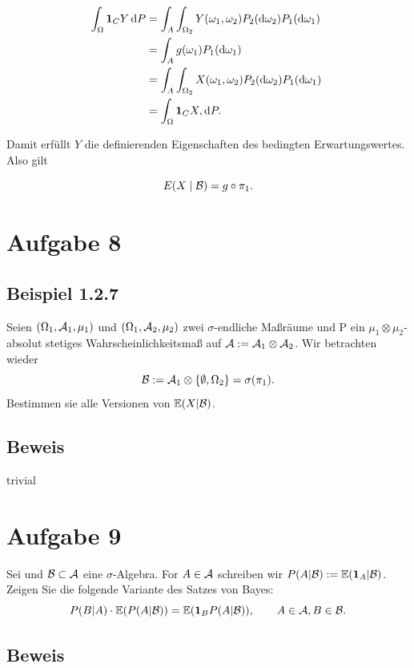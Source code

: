\documentclass[12pt]{scrartcl}
\begin{document}
$$ \begin{aligned}
\int_\Om \mathbf 1_CY\diff P &=\int_A\int_{\Om_2}Y(\om_1,\om_2)P_2(\diff \om_2)P_1(\diff \om_1)\ \\
&=\int_A g(\om_1)P_1(\diff \om_1)\ \\
&=\int_A\int_{\Om_2}X(\om_1,\om_2)P_2(\diff \om_2)P_1(\diff \om_1)\ \\
&=\int_\Om \mathbf 1_CX,\diff P. 
\end{aligned} $$

Damit erfüllt $Y$ die definierenden Eigenschaften des bedingten Erwartungswertes. Also gilt

$$E(X\mid \mathcal{B})=g\circ\pi_1.$$


\ausruecken

\section*{Aufgabe 8}
\subsection*{Beispiel 1.2.7}
\einruecken

Seien $(\Omega_1, \mathcal{A}_1, \mu_1)$ und $(\Omega_1, \mathcal{A}_2, \mu_2)$ zwei $\sigma$-endliche Maßräume und P ein $\mu_1\otimes\mu_2$-absolut stetiges Wahrscheinlichkeitsmaß auf $\mathcal{A} := \mathcal{A}_1\otimes\mathcal{A}_2$. Wir betrachten wieder
$$\mathcal{B} := \mathcal{A}_1\otimes\{\emptyset,\Omega_2\}=\sigma(\pi_1).$$
Bestimmen sie alle Versionen von $\mathbb{E}(X|\mathcal{B})$. %

\ausruecken

\subsection*{Beweis}
\einruecken

trivial

\ausruecken

\section*{Aufgabe 9}
\einruecken

Sei \WraumAnn{} und $\mathcal{B} \subset \mathcal{A}$ eine $\sigma$-Algebra. For $A\in \mathcal{A}$ schreiben wir $P(A|\mathcal{B}) := \mathbb{E}(\textbf{1}_A|\mathcal{B})$. Zeigen Sie die folgende Variante des Satzes von Bayes:
$$P(B|A)\cdot\mathbb{E}(P(A|\mathcal{B}))=\mathbb{E}(\textbf{1}_B P(A|\mathcal{B})),\qquad A\in\mathcal{A},B\in\mathcal{B}.$$

\ausruecken

\subsection*{Beweis}
\einruecken
\end{document}

